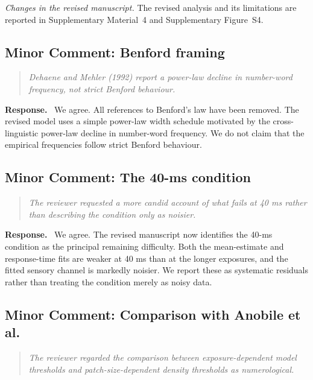 \documentclass[11pt]{article}
\newenvironment{reviewercomment}{\begin{quote}\color{reviewgray}\itshape}{\end{quote}}
\newenvironment{authorresponse}{\par\noindent\textbf{\color{responseblue}Response.}\ }{\par}
\newcommand{\change}[1]{\par\noindent\textit{Changes in the revised manuscript.} #1\par}
\begin{document}
\change{The revised analysis and its limitations are reported in Supplementary Material~4 and Supplementary Figure~S4.}

\subsection*{Minor Comment: Benford framing}

\begin{reviewercomment}
Dehaene and Mehler (1992) report a power-law decline in number-word frequency, not strict Benford behaviour.
\end{reviewercomment}

\begin{authorresponse}
We agree. All references to Benford's law have been removed. The revised model uses a simple power-law width schedule motivated by the cross-linguistic power-law decline in number-word frequency. We do not claim that the empirical frequencies follow strict Benford behaviour.
\end{authorresponse}

\subsection*{Minor Comment: The 40-ms condition}

\begin{reviewercomment}
The reviewer requested a more candid account of what fails at 40 ms rather than describing the condition only as noisier.
\end{reviewercomment}

\begin{authorresponse}
We agree. The revised manuscript now identifies the 40-ms condition as the principal remaining difficulty. Both the mean-estimate and response-time fits are weaker at 40 ms than at the longer exposures, and the fitted sensory channel is markedly noisier. We report these as systematic residuals rather than treating the condition merely as noisy data.
\end{authorresponse}

\subsection*{Minor Comment: Comparison with Anobile et al.}

\begin{reviewercomment}
The reviewer regarded the comparison between exposure-dependent model thresholds and patch-size-dependent density thresholds as numerological.
\end{reviewercomment}
\end{document}
